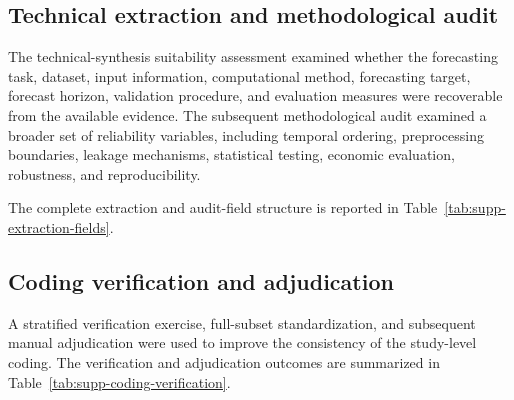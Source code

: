 \documentclass[12pt]{article}
\numberwithin{equation}{section}
\begin{document}
\FloatBarrier



\subsection{Technical extraction and methodological audit}
\label{sec:supp-extraction-audit}

The technical-synthesis suitability assessment examined whether the
forecasting task, dataset, input information, computational method,
forecasting target, forecast horizon, validation procedure, and
evaluation measures were recoverable from the available evidence.
The subsequent methodological audit examined a broader set of
reliability variables, including temporal ordering, preprocessing
boundaries, leakage mechanisms, statistical testing, economic
evaluation, robustness, and reproducibility.

The complete extraction and audit-field structure is reported in
Table~\ref{tab:supp-extraction-fields}.

% 

\FloatBarrier



\subsection{Coding verification and adjudication}
\label{sec:supp-coding-verification}

A stratified verification exercise, full-subset standardization, and
subsequent manual adjudication were used to improve the consistency of
the study-level coding. The verification and adjudication outcomes are
summarized in Table~\ref{tab:supp-coding-verification}.
\end{document}
